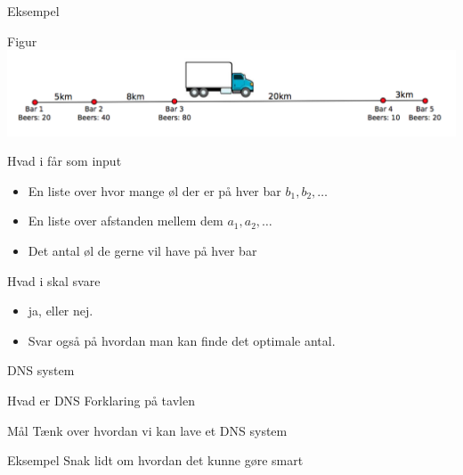 \documentclass[12pt,t]{beamer}
\begin{document}
    \begin{frame}[c]{Eksempel}
        \begin{block}{Figur}
          \includegraphics[scale=0.5]{fragt.png}
        \end{block}
        \pause
        \begin{block}{Hvad i får som input}
          \begin{itemize}
            \item En liste over hvor mange øl der er på hver bar $b_1, b_2, \dots$
            \item En liste over afstanden mellem dem $a_1, a_2, \dots$ \pause
            \item Det antal øl de gerne vil have på hver bar \pause
          \end{itemize}
        \end{block}

        \begin{block}{Hvad i skal svare}
          \begin{itemize}
            \item ja, eller nej. \pause
            \item Svar også på hvordan man kan finde det optimale antal.
          \end{itemize}
        \end{block}
    \end{frame}

    \begin{frame}{DNS system}
    \begin{block}{Hvad er DNS}
        Forklaring på tavlen
    \end{block}
      \begin{block}{Mål}
          Tænk over hvordan vi kan lave et DNS system
      \end{block}
      \pause
      \begin{exampleblock}{Eksempel}
          Snak lidt om hvordan det kunne gøre smart
      \end{exampleblock}
    \end{frame}
\end{document}
